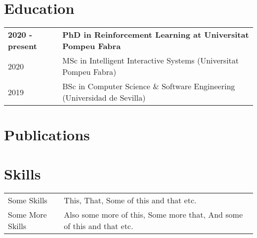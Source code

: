 \documentclass[a4paper,12pt]{article}
\begin{document}
\section{Education}
\begin{tabularx}{\linewidth}{@{}l X@{}}
    \textbf{2020 - present} & \textbf{PhD in Reinforcement Learning at Universitat Pompeu Fabra} \hfill \normalsize \\

    2020                    & MSc in Intelligent Interactive Systems (Universitat Pompeu Fabra)\hfill               \\

    2019                    & BSc in Computer Science \& Software Engineering (Universidad de Sevilla)  \hfill      \\
\end{tabularx}

\section{Publications}
\begin{refsection}
    \nocite{*}
    \printbibliography[heading=none]
\end{refsection}

\section{Skills}
\begin{tabularx}{\linewidth}{@{}l X@{}}
    Some Skills      & \normalsize{This, That, Some of this and that etc.}                                 \\
    Some More Skills & \normalsize{Also some more of this, Some more that, And some of this and that etc.} \\
\end{tabularx}

\vfill
{}
\end{document}
